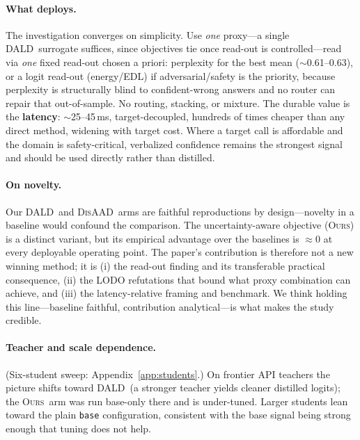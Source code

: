 \documentclass[11pt]{article}
\newcommand{\ours}{\textsc{Ours}}
\newcommand{\dald}{\textsc{DALD}}
\newcommand{\disaad}{\textsc{DisAAD}}
\begin{document}
\paragraph{What deploys.} The investigation converges on simplicity. Use \emph{one}
proxy---a single \dald\ surrogate suffices, since objectives tie once read-out is
controlled---read via \emph{one} fixed read-out chosen a priori: perplexity for the best
mean ($\sim$0.61--0.63), or a logit read-out (energy/EDL) if adversarial/safety is the
priority, because perplexity is structurally blind to confident-wrong answers and no
router can repair that out-of-sample. No routing, stacking, or mixture. The durable
value is the \textbf{latency}: $\sim$25--45\,ms, target-decoupled, hundreds of times
cheaper than any direct method, widening with target cost. Where a target call is
affordable and the domain is safety-critical, verbalized confidence remains the strongest
signal and should be used directly rather than distilled.

\paragraph{On novelty.} Our \dald\ and \disaad\ arms are faithful
reproductions by design---novelty in a baseline would confound the comparison. The
uncertainty-aware objective (\ours) is a distinct variant, but its empirical advantage
over the baselines is $\approx 0$ at every deployable operating point. The paper's
contribution is therefore not a new winning method; it is (i) the read-out finding and
its transferable practical consequence, (ii) the LODO refutations that bound what proxy
combination can achieve, and (iii) the latency-relative framing and benchmark. We think
holding this line---baseline faithful, contribution analytical---is what makes the study
credible.

\paragraph{Teacher and scale dependence.} (Six-student sweep: Appendix~\ref{app:students}.) On frontier API teachers the picture shifts
toward \dald\ (a stronger teacher yields cleaner distilled logits); the \ours\ arm was
run base-only there and is under-tuned. Larger students lean toward the plain
\texttt{base} configuration, consistent with the base signal being strong enough that
tuning does not help.

\end{document}
